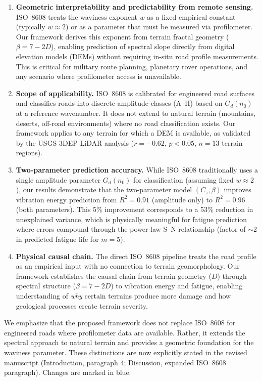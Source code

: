 \documentclass[11pt]{article}
\begin{document}
\begin{enumerate}
    \item \textbf{Geometric interpretability and predictability from remote sensing.} ISO~8608 treats the waviness exponent $w$ as a fixed empirical constant (typically $w \approx 2$) or as a parameter that must be measured via profilometer. Our framework derives this exponent from terrain fractal geometry ($\beta = 7-2D$), enabling prediction of spectral slope directly from digital elevation models (DEMs) without requiring in-situ road profile measurements. This is critical for military route planning, planetary rover operations, and any scenario where profilometer access is unavailable.

    \item \textbf{Scope of applicability.} ISO~8608 is calibrated for engineered road surfaces and classifies roads into discrete amplitude classes (A--H) based on $G_d(n_0)$ at a reference wavenumber. It does not extend to natural terrain (mountains, deserts, off-road environments) where no road classification exists. Our framework applies to any terrain for which a DEM is available, as validated by the USGS 3DEP LiDAR analysis ($r = -0.62$, $p < 0.05$, $n = 13$ terrain regions).

    \item \textbf{Two-parameter prediction accuracy.} While ISO~8608 traditionally uses a single amplitude parameter $G_d(n_0)$ for classification (assuming fixed $w \approx 2$), our results demonstrate that the two-parameter model $(C_z, \beta)$ improves vibration energy prediction from $R^2 = 0.91$ (amplitude only) to $R^2 = 0.96$ (both parameters). This 5\% improvement corresponds to a 53\% reduction in unexplained variance, which is physically meaningful for fatigue prediction where errors compound through the power-law S--N relationship (factor of $\sim$2 in predicted fatigue life for $m = 5$).

    \item \textbf{Physical causal chain.} The direct ISO~8608 pipeline treats the road profile as an empirical input with no connection to terrain geomorphology. Our framework establishes the causal chain from terrain geometry ($D$) through spectral structure ($\beta = 7-2D$) to vibration energy and fatigue, enabling understanding of \emph{why} certain terrains produce more damage and how geological processes create terrain severity.
\end{enumerate}

We emphasize that the proposed framework does not replace ISO~8608 for engineered roads where profilometer data are available. Rather, it extends the spectral approach to natural terrain and provides a geometric foundation for the waviness parameter. These distinctions are now explicitly stated in the revised manuscript (Introduction, paragraph 4; Discussion, expanded ISO~8608 paragraph). Changes are marked in {\color{revisionblue}blue}.
\end{document}
